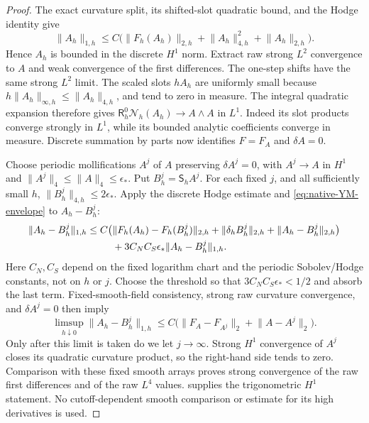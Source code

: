 \documentclass[11pt]{article}
\numberwithin{equation}{section}
\theoremstyle{definition}
\theoremstyle{remark}
\newcommand{\norm}[1]{\lVert#1\rVert}
\begin{document}
\begin{proof}
The exact curvature split, its shifted-slot quadratic bound, and the Hodge
identity give
\[
 \norm{A_h}_{1,h}\le C\bigl(\norm{F_h(A_h)}_{2,h}
                   +\norm{A_h}_{4,h}^2+\norm{A_h}_{2,h}\bigr).
\]
Hence $A_h$ is bounded in the discrete $H^1$ norm.  Extract raw strong
$L^2$ convergence to $A$ and weak convergence of the first differences.
The one-step shifts have the same strong $L^2$ limit.
The scaled slots $hA_h$ are uniformly small because
$h\norm{A_h}_{\infty,h}\le\norm{A_h}_{4,h}$, and tend to zero in measure.
The integral quadratic expansion therefore gives
$\mathsf R_h^0\mathcal N_h(A_h)\to A\wedge A$ in $L^1$.
Indeed its slot products converge strongly in $L^1$, while its bounded
analytic coefficients converge in measure.  Discrete summation by parts
now identifies $F=F_A$ and $\delta A=0$.

Choose periodic mollifications $A^j$ of $A$ preserving $\delta A^j=0$,
with $A^j\to A$ in $H^1$ and
$\norm{A^j}_4\le\norm A_4\le\epsilon_*$.  Put
$B_h^j=\mathsf S_hA^j$.  For each fixed $j$, and all sufficiently small
$h$, $\norm{B_h^j}_{4,h}\le2\epsilon_*$.  Apply the discrete Hodge
estimate and \eqref{eq:native-YM-envelope} to $A_h-B_h^j$:
\begin{align}
 \norm{A_h-B_h^j}_{1,h}
 \le C\bigl(&\norm{F_h(A_h)-F_h(B_h^j)}_{2,h}
       +\norm{\delta_hB_h^j}_{2,h}
       +\norm{A_h-B_h^j}_{2,h}\bigr)\notag\\
       &+3C_NC_S\epsilon_*\norm{A_h-B_h^j}_{1,h}.
 \label{eq:native-Coulomb-explicit-absorption}
\end{align}
Here $C_N,C_S$ depend on the fixed logarithm chart and the periodic
Sobolev/Hodge constants, not on $h$ or $j$.  Choose the threshold so that
$3C_NC_S\epsilon_*<1/2$ and absorb the last term.  Fixed-smooth-field
consistency, strong raw curvature convergence, and
$\delta A^j=0$ then imply
\[
 \limsup_{h\downarrow0}\norm{A_h-B_h^j}_{1,h}
 \le C\bigl(\norm{F_A-F_{A^j}}_2+\norm{A-A^j}_2\bigr).
\]
Only after this limit is taken do we let $j\to\infty$.
Strong $H^1$ convergence of $A^j$ closes its quadratic curvature product,
so the right-hand side tends to zero.  Comparison with these fixed smooth
arrays proves strong convergence of the raw first differences and of the
raw $L^4$ values.   supplies
the trigonometric $H^1$ statement.  No cutoff-dependent smooth comparison
or estimate for its high derivatives is used.
\end{proof}
\end{document}
